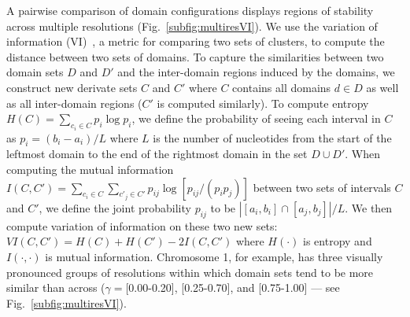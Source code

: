 \documentclass[12pt]{cmuthesis}
\begin{document}
  A pairwise comparison of domain configurations displays regions of stability across multiple resolutions (Fig.~\ref{subfig:multiresVI}). We use the variation of information (VI)~\cite{Meila2003}, a metric for comparing two sets of clusters, to compute the distance between two sets of domains. To capture the similarities between two domain sets $D$ and $D'$ and the inter-domain regions induced by the domains, we construct new derivate sets $C$ and $C'$ where $C$ contains all domains $d \in D$ as well as all inter-domain regions ($C'$ is computed similarly). To compute entropy $H(C) = \sum_{c_i  \in C} p_i \log p_i$, we define the probability of seeing each interval in $C$ as $p_i = (b_i - a_i) / L$ where $L$ is the number of nucleotides from the start of the leftmost domain to the end of the rightmost domain in the set $D \cup D'$. When computing the mutual information $I(C, C') = \sum_{c_i \in C} \sum_{c'_j \in C'} p_{ij} \log[ p_{ij} / (p_i p_j) ]$ between two sets of intervals $C$ and $C'$, we define the joint probability $p_{ij}$ to be $| [a_i, b_i] \cap [a_j, b_j] | / L$.
  We then compute variation of information on these two new sets: $VI(C, C') =  H(C) + H(C') - 2I(C, C')$ where $H(\cdot)$ is entropy and $I(\cdot, \cdot)$ is mutual information. Chromosome 1, for example, has three visually pronounced groups of resolutions within which domain sets tend to be more similar than across ($\gamma = $[0.00-0.20], [0.25-0.70], and [0.75-1.00] --- see Fig.~\ref{subfig:multiresVI}).
\end{document}
